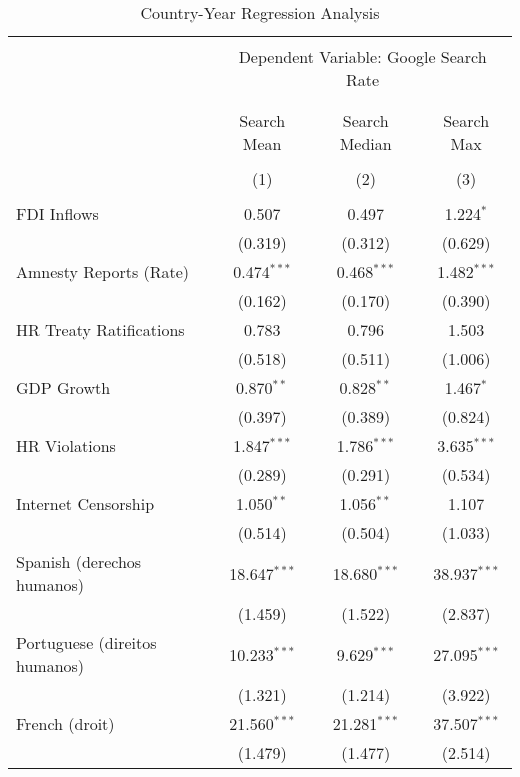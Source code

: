 
\begin{table}[!htbp] \centering 
  \caption{Country-Year Regression Analysis} 
  \label{} 
\begin{tabular}{@{\extracolsep{5pt}}lccc} 
\\[-1.8ex]\hline 
\hline \\[-1.8ex] 
 & \multicolumn{3}{c}{Dependent Variable: Google Search Rate} \\ 
\cline{2-4} 
\\[-1.8ex] & \multicolumn{3}{c}{ } \\ 
 & Search Mean & Search Median & Search Max \\ 
\\[-1.8ex] & (1) & (2) & (3)\\ 
\hline \\[-1.8ex] 
 FDI Inflows & 0.507 & 0.497 & 1.224$^{*}$ \\ 
  & (0.319) & (0.312) & (0.629) \\ 
  Amnesty Reports (Rate) & 0.474$^{***}$ & 0.468$^{***}$ & 1.482$^{***}$ \\ 
  & (0.162) & (0.170) & (0.390) \\ 
  HR Treaty Ratifications & 0.783 & 0.796 & 1.503 \\ 
  & (0.518) & (0.511) & (1.006) \\ 
  GDP Growth & 0.870$^{**}$ & 0.828$^{**}$ & 1.467$^{*}$ \\ 
  & (0.397) & (0.389) & (0.824) \\ 
  HR Violations & 1.847$^{***}$ & 1.786$^{***}$ & 3.635$^{***}$ \\ 
  & (0.289) & (0.291) & (0.534) \\ 
  Internet Censorship & 1.050$^{**}$ & 1.056$^{**}$ & 1.107 \\ 
  & (0.514) & (0.504) & (1.033) \\ 
  Spanish (derechos humanos) & 18.647$^{***}$ & 18.680$^{***}$ & 38.937$^{***}$ \\ 
  & (1.459) & (1.522) & (2.837) \\ 
  Portuguese (direitos humanos) & 10.233$^{***}$ & 9.629$^{***}$ & 27.095$^{***}$ \\ 
  & (1.321) & (1.214) & (3.922) \\ 
  French (droit) & 21.560$^{***}$ & 21.281$^{***}$ & 37.507$^{***}$ \\ 
  & (1.479) & (1.477) & (2.514) \\ 

\end{tabular}
\end{table}
